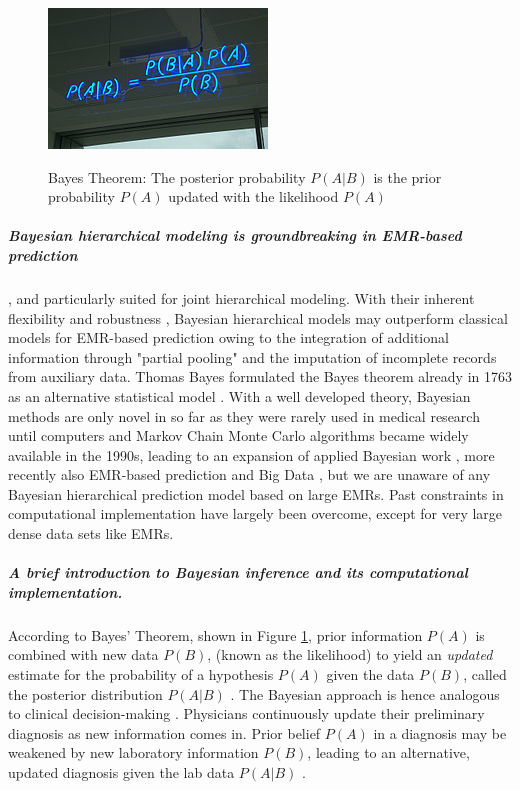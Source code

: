 \documentclass[11pt,notitlepage]{article}
\begin{document}
\begin{figure} %
 \vspace{-10pt}
 \href{http://en.wikipedia.org/wiki/Bayes'_theorem}{ \includegraphics[scale=0.6]{Figures/BayesTheorem.jpg}}
  \vspace{-20pt}
 \caption{\footnotesize Bayes Theorem: The posterior probability $P(A|B)$ is the prior probability $P(A)$ updated with the  likelihood $P(A)$}
 \vspace{-20pt}
 \label{fig:BayesTheorem}
\end{figure}

\subparagraph*{Bayesian hierarchical modeling is groundbreaking in EMR-based prediction}, and particularly suited for joint hierarchical modeling. With their inherent flexibility and robustness \cite{Carlin_1349763,Sutton_2012}, Bayesian hierarchical models may outperform classical models for EMR-based prediction owing to the integration of additional information through "partial pooling" \cite{Gelman_red_2009} and the imputation of incomplete records from auxiliary data. Thomas Bayes formulated the Bayes theorem already in 1763 as an alternative statistical model \cite{Thomas_Bayes}. With a well developed theory, Bayesian methods are only novel in so far as they were rarely used in medical research until computers and Markov Chain Monte Carlo algorithms became widely available in the 1990s, leading to an expansion of applied Bayesian work \cite{Ashby_16947924,Spiegelhalter_11134920}, more recently also EMR-based prediction \cite{Himes_19261943,Ryynaenen_23496851,Wu_20473190} and Big Data \cite{Yoo_24987556}, but we are unaware of any Bayesian hierarchical prediction model based on large EMRs. Past constraints in computational implementation have largely been overcome, except for very large dense data sets like EMRs. 

\subparagraph*{A brief introduction to Bayesian inference and its computational implementation.}

According to Bayes' Theorem, shown in Figure \ref{fig:BayesTheorem}, prior information $P(A)$ is combined with new data $P(B)$, (known as the likelihood) to yield an \textit{updated} estimate for the probability of a hypothesis $P(A)$ given the data $P(B)$, called the posterior distribution $P(A|B)$ \cite{Kruschke_Book_2014}. The Bayesian approach is hence analogous to clinical decision-making \cite{Spiegelhalter_11134920}. Physicians continuously update their preliminary diagnosis as new information comes in. Prior belief $P(A)$ in a diagnosis may be weakened by new laboratory information $P(B)$, leading to an alternative, updated diagnosis given the lab data $P(A|B)$ \cite{Kruschke_22774788}. 
\end{document}
